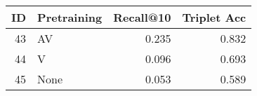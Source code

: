 \begin{tabular}{rlrr}
\toprule
 ID & Pretraining &  Recall@10 &  Triplet Acc \\
\midrule
 43 &          AV &      0.235 &        0.832 \\
 44 &           V &      0.096 &        0.693 \\
 45 &        None &      0.053 &        0.589 \\
\bottomrule
\end{tabular}
